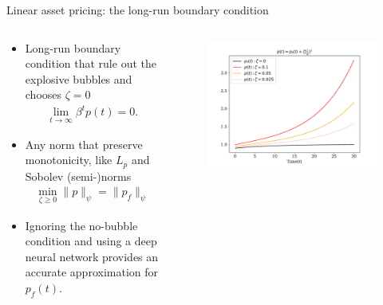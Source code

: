 \documentclass[aspectratio=169,10pt]{beamer}
\begin{document}
\begin{frame}{Linear asset pricing: the long-run boundary condition}
	\begin{columns}
		\begin{column}{0.5\textwidth}
			\begin{itemize}
				\item Long-run boundary condition that rule out the explosive bubbles and chooses $\zeta =0$
				\begin{align*}
					\lim_{t\rightarrow \infty} \beta^t p(t) = 0.
				\end{align*}
				\vspace{0.1in}
				\item Any norm that preserve monotonicity, like $L_p$ and Sobolev (semi-)norms 
				\begin{align*}
					\min_{\zeta\geq 0} \|p\|_\psi = \|p_f\|_\psi
				\end{align*}
				\item Ignoring the no-bubble condition and using a deep neural network provides an accurate approximation for $p_f(t)$.
			\end{itemize}
		\end{column}
		\begin{column}{0.5\textwidth}
			\begin{figure}[t!]
				\centering
				\includegraphics[width=\textwidth]{figs/bubble_solution.pdf}
				\vspace{-7mm}
			\end{figure}
		\end{column}
	\end{columns}
\end{frame}
\end{document}
